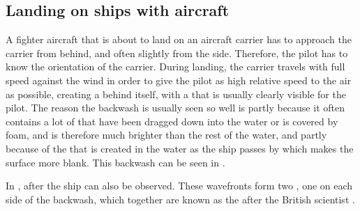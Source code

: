 \subsection{Landing on ships with aircraft}

A fighter aircraft that is about to land on an aircraft carrier has to approach the carrier from behind, and often slightly from the side. Therefore, the pilot has to know the orientation of the carrier. During landing, the carrier travels with full speed against the wind in order to give the pilot as high relative speed to the air as possible, creating a \wake behind itself, with a \backwash that is usually clearly visible for the pilot. The reason the backwash is usually seen so well is partly because it often contains a lot of  that have been dragged down into the water or is covered by foam, and is therefore much brighter than the rest of the water, and partly because of the \turbulence that is created in the water as the ship passes by which makes the surface more blank. This backwash can be seen in .

In ,  after the ship can also be observed. These wavefronts form two , one on each side of the backwash, which together are known as the  after the British scientist .

